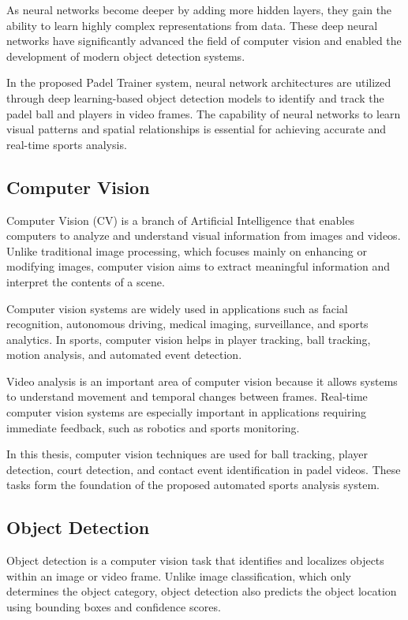 As neural networks become deeper by adding more hidden layers, they gain the ability to learn highly complex representations from data. These deep neural networks have significantly advanced the field of computer vision and enabled the development of modern object detection systems.

In the proposed Padel Trainer system, neural network architectures are utilized through deep learning-based object detection models to identify and track the padel ball and players in video frames. The capability of neural networks to learn visual patterns and spatial relationships is essential for achieving accurate and real-time sports analysis.

\subsection{Computer Vision}

Computer Vision (CV) is a branch of Artificial Intelligence that enables computers to analyze and understand visual information from images and videos. Unlike traditional image processing, which focuses mainly on enhancing or modifying images, computer vision aims to extract meaningful information and interpret the contents of a scene.

Computer vision systems are widely used in applications such as facial recognition, autonomous driving, medical imaging, surveillance, and sports analytics. In sports, computer vision helps in player tracking, ball tracking, motion analysis, and automated event detection.

Video analysis is an important area of computer vision because it allows systems to understand movement and temporal changes between frames. Real-time computer vision systems are especially important in applications requiring immediate feedback, such as robotics and sports monitoring.

In this thesis, computer vision techniques are used for ball tracking, player detection, court detection, and contact event identification in padel videos. These tasks form the foundation of the proposed automated sports analysis system.

\subsection{Object Detection}

Object detection is a computer vision task that identifies and localizes objects within an image or video frame. Unlike image classification, which only determines the object category, object detection also predicts the object location using bounding boxes and confidence scores.

